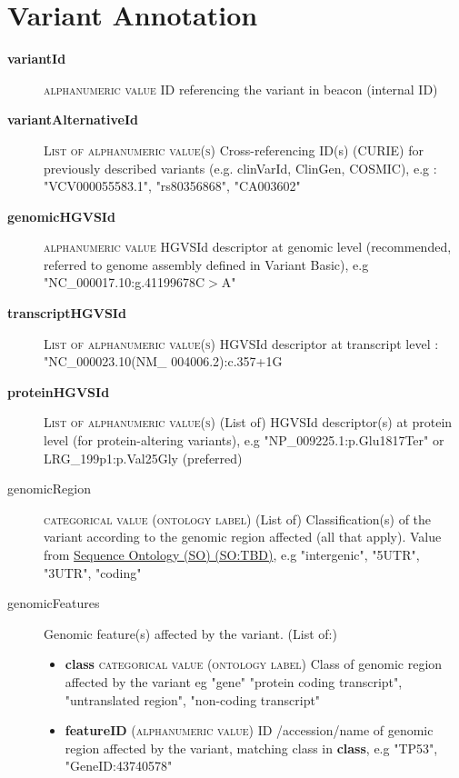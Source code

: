 \documentclass[a4paper, 10pt]{article}        %
\begin{document}
 
  \section*{ {\color{teal} Variant Annotation}}
  
  \begin{description}
	\item[\textbf{variantId}] {\textsc{alphanumeric value}} ID referencing the variant in beacon (internal ID)
	\item[\textbf{variantAlternativeId}] {\textsc{List of alphanumeric value(s)}} Cross-referencing ID(s) (CURIE) for previously described variants (e.g. clinVarId, ClinGen, COSMIC), e.g : "VCV000055583.1", "rs80356868", "CA003602"
	\item[\textbf{genomicHGVSId}]  {\textsc{alphanumeric value}} HGVSId descriptor at genomic level (recommended, referred to genome assembly defined in Variant Basic), e.g "NC\_000017.10:g.41199678C$>$A"
	\item[\textbf{transcriptHGVSId}] {\textsc{List of alphanumeric value(s)}} HGVSId descriptor at transcript level : "NC\_000023.10(NM\_ 004006.2):c.357+1G%
	\item[\textbf{proteinHGVSId}] {\textsc{List of alphanumeric value(s)}} (List of) HGVSId descriptor(s) at protein level (for protein-altering variants), e.g "NP\_009225.1:p.Glu1817Ter" or LRG\_199p1:p.Val25Gly (preferred)
	\item[genomicRegion] {\textsc{categorical value (ontology label)}} (List of) Classification(s) of the variant according to the genomic region affected (all that apply). Value from \href{link}{Sequence Ontology (SO) (SO:TBD)}, e.g "intergenic", "5UTR", "3UTR", "coding" %
	\item[genomicFeatures] Genomic feature(s) affected by the variant. (List of:)
	\begin{itemize}
			\item[]  \textbf{class} {\textsc{categorical value (ontology label)}} Class of genomic region affected by the variant eg "gene" "protein coding transcript", "untranslated region", "non-coding transcript"
			\item[]  \textbf{featureID} {\textsc{(alphanumeric value)}} ID /accession/name of genomic region affected by the variant, matching class in \textbf{class}, e.g "TP53", "GeneID:43740578"
	\end{itemize} 

\end{description}
\end{document}
